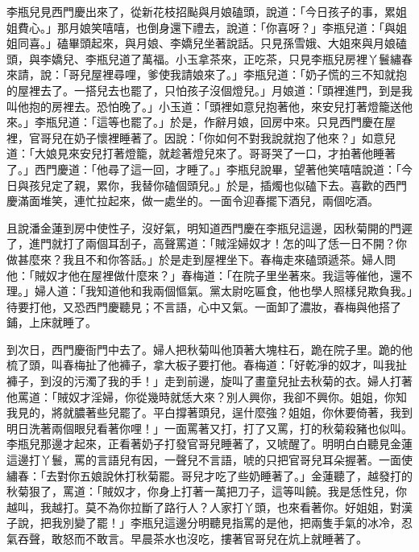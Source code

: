 李瓶兒見西門慶出來了，從新花枝招颭與月娘磕頭，說道：「今日孩子的事，累姐姐費心。」那月娘笑嘻嘻，也倒身還下禮去，說道：「你喜呀？」李瓶兒道：「與姐姐同喜。」磕畢頭起來，與月娘、李嬌兒坐著說話。只見孫雪娥、大姐來與月娘磕頭，與李嬌兒、李瓶兒道了萬福。小玉拿茶來，正吃茶，只見李瓶兒房裡丫鬟繡春來請，說：「哥兒屋裡尋哩，爹使我請娘來了。」李瓶兒道：「奶子慌的三不知就抱的屋裡去了。一搭兒去也罷了，只怕孩子沒個燈兒。」月娘道：「頭裡進門，到是我叫他抱的房裡去。恐怕晚了。」小玉道：「頭裡如意兒抱著他，來安兒打著燈籠送他來。」李瓶兒道：「這等也罷了。」於是，作辭月娘，回房中來。只見西門慶在屋裡，官哥兒在奶子懷裡睡著了。因說：「你如何不對我說就抱了他來？」如意兒道：「大娘見來安兒打著燈籠，就趁著燈兒來了。哥哥哭了一口，才拍著他睡著了。」西門慶道：「他尋了這一回，才睡了。」李瓶兒說畢，望著他笑嘻嘻說道：「今日與孩兒定了親，累你，我替你磕個頭兒。」於是，插燭也似磕下去。喜歡的西門慶滿面堆笑，連忙拉起來，做一處坐的。一面令迎春擺下酒兒，兩個吃酒。

且說潘金蓮到房中使性子，沒好氣，明知道西門慶在李瓶兒這邊，因秋菊開的門遲了，進門就打了兩個耳刮子，高聲罵道：「賊淫婦奴才！怎的叫了恁一日不開？你做甚麼來？我且不和你答話。」於是走到屋裡坐下。春梅走來磕頭遞茶。婦人問他：「賊奴才他在屋裡做什麼來？」春梅道：「在院子里坐著來。我這等催他，還不理。」婦人道：「我知道他和我兩個慪氣。黨太尉吃匾食，他也學人照樣兒欺負我。」待要打他，又恐西門慶聽見；不言語，心中又氣。一面卸了濃妝，春梅與他搭了鋪，上床就睡了。

到次日，西門慶衙門中去了。婦人把秋菊叫他頂著大塊柱石，跪在院子里。跪的他梳了頭，叫春梅扯了他褲子，拿大板子要打他。春梅道：「好乾凈的奴才，叫我扯褲子，到沒的污濁了我的手！」走到前邊，旋叫了畫童兒扯去秋菊的衣。婦人打著他罵道：「賊奴才淫婦，你從幾時就恁大來？別人興你，我卻不興你。姐姐，你知我見的，將就膿著些兒罷了。平白撐著頭兒，逞什麼強？姐姐，你休要倚著，我到明日洗著兩個眼兒看著你哩！」一面罵著又打，打了又罵，打的秋菊殺豬也似叫。李瓶兒那邊才起來，正看著奶子打發官哥兒睡著了，又唬醒了。明明白白聽見金蓮這邊打丫鬟，罵的言語兒有因，一聲兒不言語，唬的只把官哥兒耳朵握著。一面使繡春：「去對你五娘說休打秋菊罷。哥兒才吃了些奶睡著了。」金蓮聽了，越發打的秋菊狠了，罵道：「賊奴才，你身上打著一萬把刀子，這等叫饒。我是恁性兒，你越叫，我越打。莫不為你拉斷了路行人？人家打丫頭，也來看著你。好姐姐，對漢子說，把我別變了罷！」李瓶兒這邊分明聽見指罵的是他，把兩隻手氣的冰冷，忍氣吞聲，敢怒而不敢言。早晨茶水也沒吃，摟著官哥兒在炕上就睡著了。

